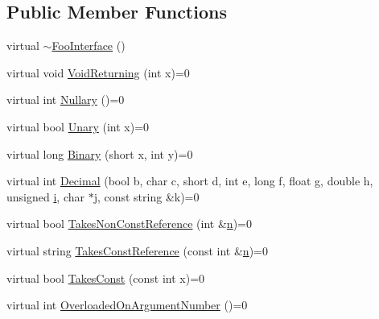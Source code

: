 \subsection*{Public Member Functions}
\begin{DoxyCompactItemize}
\item 
virtual \hyperlink{classtesting_1_1gmock__generated__function__mockers__test_1_1FooInterface_ad4eb4709c9ae9b1cdaded8d05567cdbb}{$\sim$\+Foo\+Interface} ()
\item 
virtual void \hyperlink{classtesting_1_1gmock__generated__function__mockers__test_1_1FooInterface_adf968115cf1260004d8abe372dc71c85}{Void\+Returning} (int x)=0
\item 
virtual int \hyperlink{classtesting_1_1gmock__generated__function__mockers__test_1_1FooInterface_a633e753eafa7f82dde22ecf9492f341c}{Nullary} ()=0
\item 
virtual bool \hyperlink{classtesting_1_1gmock__generated__function__mockers__test_1_1FooInterface_ae0885ac29bc4a3f180f6573d8b1a341e}{Unary} (int x)=0
\item 
virtual long \hyperlink{classtesting_1_1gmock__generated__function__mockers__test_1_1FooInterface_a59ea28b711ece054ce9d57c2dc574ba0}{Binary} (short x, int y)=0
\item 
virtual int \hyperlink{classtesting_1_1gmock__generated__function__mockers__test_1_1FooInterface_a5c5886880581d8dd420c9a187ff884b2}{Decimal} (bool b, char c, short d, int e, long f, float g, double h, unsigned \hyperlink{gtest__output__test__golden__lin_8txt_a7e98b8a17c0aad30ba64d47b74e2a6c1}{i}, char $\ast$j, const string \&k)=0
\item 
virtual bool \hyperlink{classtesting_1_1gmock__generated__function__mockers__test_1_1FooInterface_a694354adfffcee58093298bc12182ff5}{Takes\+Non\+Const\+Reference} (int \&\hyperlink{app_2main_8cpp_acfc02ec89670db29251fda6a66602ce2}{n})=0
\item 
virtual string \hyperlink{classtesting_1_1gmock__generated__function__mockers__test_1_1FooInterface_a3db03c9698ecddfc62f2a1ed2f3c32c2}{Takes\+Const\+Reference} (const int \&\hyperlink{app_2main_8cpp_acfc02ec89670db29251fda6a66602ce2}{n})=0
\item 
virtual bool \hyperlink{classtesting_1_1gmock__generated__function__mockers__test_1_1FooInterface_a8c53e87edf0b9da878e5259f02b7f5dc}{Takes\+Const} (const int x)=0
\item 
virtual int \hyperlink{classtesting_1_1gmock__generated__function__mockers__test_1_1FooInterface_ae9e86ac64fa9acedfb1fa747174c7f43}{Overloaded\+On\+Argument\+Number} ()=0

\end{DoxyCompactItemize}
